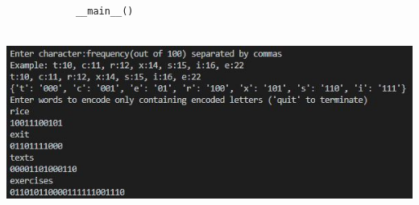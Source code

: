\documentclass[addpoints,11pt]{exam}
\begin{document}
\begin{questions}
\begin{solutionorbox}
\begin{verbatim}
			__main__()
			\end{verbatim} \\
			\includegraphics[width=1\textwidth]{huffmanpython.JPG}
		\end{solutionorbox}
		
		
		
		
	\end{questions}
\end{document}
